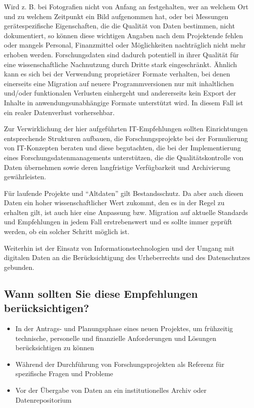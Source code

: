Wird z. B. bei Fotografien nicht von Anfang an festgehalten, wer an welchem Ort und zu welchem Zeitpunkt ein Bild aufgenommen hat, oder bei Messungen gerätespezifische Eigenschaften, die die Qualität von Daten bestimmen, nicht dokumentiert, so können diese wichtigen Angaben nach dem Projektende fehlen oder mangels Personal, Finanzmittel oder Möglichkeiten nachträglich nicht mehr erhoben werden. Forschungsdaten sind dadurch potentiell in ihrer Qualität für eine wissenschaftliche Nachnutzung durch Dritte stark eingeschränkt. Ähnlich kann es sich bei der Verwendung proprietärer Formate verhalten, bei denen einerseits eine Migration auf neuere Programmversionen nur mit inhaltlichen und/oder funktionalen Verlusten einhergeht und andererseits kein Export der Inhalte in anwendungsunabhängige Formate unterstützt wird. In diesem Fall ist ein realer Datenverlust vorhersehbar.

Zur Verwirklichung der hier aufgeführten IT-Empfehlungen sollten Einrichtungen entsprechende Strukturen aufbauen, die Forschungsprojekte bei der Formulierung von IT-Konzepten beraten und diese begutachten, die bei der Implementierung eines Forschungsdatenmanagements unterstützen, die die Qualitätskontrolle von Daten übernehmen sowie deren langfristige Verfügbarkeit und Archivierung gewährleisten.

Für laufende Projekte und "`Altdaten"' gilt Bestandsschutz. Da aber auch diesen Daten ein hoher wissenschaftlicher Wert zukommt, den es in der Regel zu erhalten gilt, ist auch hier eine Anpassung bzw. Migration auf aktuelle Standards und Empfehlungen in jedem Fall erstrebenswert und es sollte immer geprüft werden, ob ein solcher Schritt möglich ist.

Weiterhin ist der Einsatz von Informationstechnologien und der Umgang mit digitalen Daten an die Berücksichtigung des Urheberrechts und des Datenschutzes gebunden.


\subsection*{Wann sollten Sie diese Empfehlungen berücksichtigen?}
\begin{itemize}
	\item In der Antrags- und Planungsphase eines neuen Projektes, um frühzeitig technische, personelle und finanzielle Anforderungen und Lösungen berücksichtigen zu können
	\item Während der Durchführung von Forschungsprojekten als Referenz für spezifische Fragen und Probleme
	\item Vor der Übergabe von Daten an ein institutionelles Archiv oder Datenrepositorium
\end{itemize}

